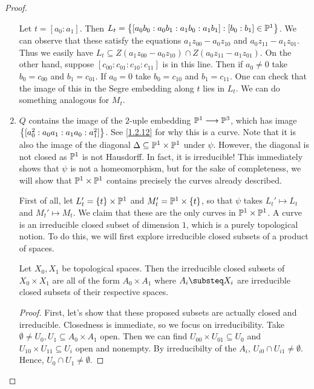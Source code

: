 \begin{proof}
\begin{enumerate}[label = (\alph*)]
        Let $t = [a_0 : a_1]$. Then $L_t = \curly{[a_0 b_0 : a_0 b_1 : a_1 b_0 : a_1 b_1] : [b_0 : b_1] \in \P^1}$. We can observe that these satisfy the equations $a_1 z_{00} - a_0 z_{10}$ and $a_0 z_{11} - a_1 z_{01}$. Thus we easily have $L_t \subseteq Z(a_1 z_{00} - a_0 z_{10}) \cap Z(a_0 z_{11} - a_1 z_{01})$. On the other hand, suppose $[c_{00} : c_{01} : c_{10} : c_{11}]$ is in this line. Then if $a_0 \neq 0$ take $b_0 = c_{00}$ and $b_1 = c_{01}$. If $a_0 = 0$ take $b_0 = c_{10}$ and $b_1 = c_{11}$. One can check that the image of this in the Segre embedding along $t$ lies in $L_t$. We can do something analogous for $M_t$.

        \item $Q$ contains the image of the $2$-uple embedding $\P^1 \longrightarrow \P^3$, which has image $\curly{[a_0^2 : a_0 a_1 : a_1 a_0 : a_1^2]}$. See \ref{1.2.12} for why this is a curve. Note that it is also the image of the diagonal $\Delta \subseteq \P^1 \times \P^1$ under $\psi$. However, the diagonal is not closed as $\P^1$ is not Hausdorff. In fact, it is irreducible! This immediately shows that $\psi$ is not a homeomorphism, but for the sake of completeness, we will show that $\P^1 \times \P^1$ contains precisely the curves already described.

        First of all, let $L_t' = \curly{t} \times \P^1$ and $M_t' = \P^1 \times \curly{t}$, so that $\psi$ takes $L_t' \mapsto L_t$ and $M_t' \mapsto M_t$. We claim that these are the only curves in $\P^1 \times \P^1$. A curve is an irreducible closed subset of dimension $1$, which is a purely topological notion. To do this, we will first explore irreducible closed subsets of a product of spaces.

        \begin{lemma}
            Let $X_0, X_1$ be topological spaces. Then the irreducible closed subsets of $X_0 \times X_1$ are all of the form $A_0 \times A_1$ where $A_i \substeq X_i$ are irreducible closed subsets of their respective spaces.
        \end{lemma}
        \begin{proof}
            First, let's show that these proposed subsets are actually closed and irreducible. Closedness is immediate, so we focus on irreducibility. Take $\emptyset \neq U_0, U_1 \subseteq A_0 \times A_1$ open. Then we can find $U_{00} \times U_{01} \subseteq U_0$ and $U_{10} \times U_{11} \subseteq U_i$ open and nonempty. By irreducibilty of the $A_i$, $U_{i0} \cap U_{i1} \neq \emptyset$. Hence, $U_0 \cap U_1 \neq \emptyset$.


\end{proof}
\end{enumerate}
\end{proof}
